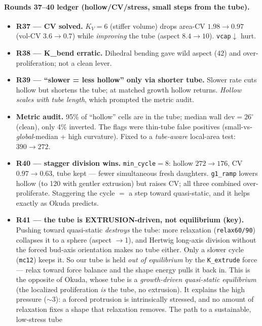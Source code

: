 \documentclass[11pt]{article}
\begin{document}
\paragraph{Rounds 37--40 ledger (hollow/CV/stress, small steps from the tube).}
\begin{itemize}\itemsep1pt
\item \textbf{R37 --- CV solved.} $K_V\!=\!6$ (stiffer volume) drops area-CV $1.98\!\to\!0.97$ (vol-CV
$3.6\!\to\!0.7$) while \emph{improving} the tube (aspect $8.4\!\to\!10$). \texttt{vcap}$\downarrow$ hurt.
\item \textbf{R38 --- K\_bend erratic.} Dihedral bending gave wild aspect ($42$) and over-proliferation;
not a clean lever.
\item \textbf{R39 --- ``slower = less hollow'' only via shorter tube.} Slower rate cuts hollow but shortens
the tube; at matched growth hollow returns. \emph{Hollow scales with tube length}, which prompted the metric
audit.
\item \textbf{Metric audit.} 95\% of ``hollow'' cells are in the tube; median wall $\mathrm{dev}=26^\circ$
(clean), only 4\% inverted. The flags were thin-tube false positives (small-vs-\emph{global}-median + high
curvature). Fixed to a \emph{tube-aware} local-area test: $390\!\to\!272$.
\item \textbf{R40 --- stagger division wins.} \texttt{min\_cycle}$=8$: hollow $272\!\to\!176$, CV
$0.97\!\to\!0.63$, tube kept --- fewer simultaneous fresh daughters. \texttt{g1\_ramp} lowers hollow (to 120
with gentler extrusion) but raises CV; all three combined over-proliferate. Staggering the cycle $=$ a step
toward quasi-static, and it helps exactly as Okuda predicts.
\item \textbf{R41 --- the tube is EXTRUSION-driven, not equilibrium (key).} Pushing toward quasi-static
\emph{destroys} the tube: more relaxation (\texttt{relax60/90}) collapses it to a sphere (aspect $\to$1),
and Hertwig long-axis division without the forced bud-axis orientation makes no tube either. Only a slower
cycle (\texttt{mc12}) keeps it. So our tube is held \emph{out of equilibrium} by the \texttt{K\_extrude}
force --- relax toward force balance and the shape energy pulls it back in. This is the opposite of Okuda,
whose tube is a \emph{growth-driven quasi-static equilibrium} (the localized proliferation \emph{is} the
tube, no extrusion). It explains the high pressure ($\sim$3): a forced protrusion is intrinsically stressed,
and no amount of relaxation fixes a shape that relaxation removes. The path to a sustainable, low-stress tube

\end{itemize}
\end{document}
